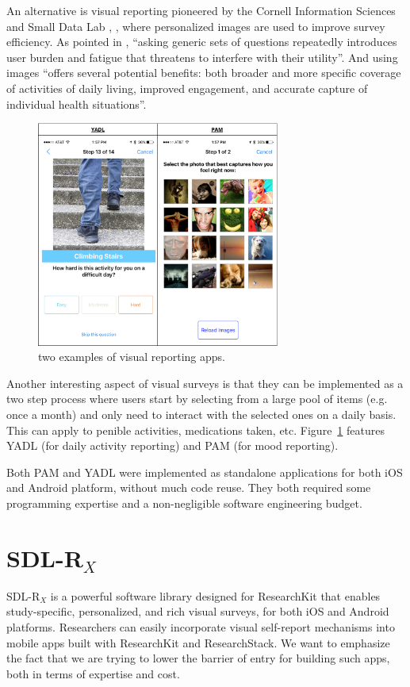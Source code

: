 \documentclass{acm_proc_article-sp}
\newcommand{\sdlrx}{SDL-R$_X$}
\begin{document}
An alternative is visual reporting pioneered by the Cornell Information Sciences \cite{Aung2016-rx} and Small Data Lab \cite{Yang2016-dn}, \cite{noauthor_2015-gf} , where personalized images are used to improve survey efficiency.
As pointed in \cite{Yang2016-dn}, ``asking generic sets of questions repeatedly introduces user burden and fatigue that threatens to interfere with their utility''. And using images ``offers several potential benefits: both broader and more specific coverage of activities of daily living, improved engagement, and accurate capture of individual health situations''.

\begin{figure}[h!]
\centering
\includegraphics[width=8cm]{IMG/visual-apps.png}
\caption{two examples of visual reporting apps.}
\label{fig::visual-apps}
\end{figure}

Another interesting aspect of visual surveys is that they can be implemented as a two step process where users start by selecting from a large pool of items (e.g. once a month) and only need to interact with the selected ones on a daily basis. This can apply to penible activities, medications taken, etc. Figure~\ref{fig::visual-apps} features YADL (for daily activity reporting) and PAM (for mood reporting).

Both PAM and YADL were implemented as standalone applications for both iOS and Android platform, without much code reuse. They both required some programming expertise and a non-negligible software engineering budget.

\section{\sdlrx}
\sdlrx{} is a powerful software library designed for ResearchKit that enables study-specific, personalized, and rich visual surveys, for both iOS and Android platforms. Researchers can easily incorporate visual self-report mechanisms into mobile apps built with ResearchKit and ResearchStack. We want to emphasize the fact that we are trying to lower the barrier of entry for building such apps, both in terms of expertise and cost.
\end{document}
